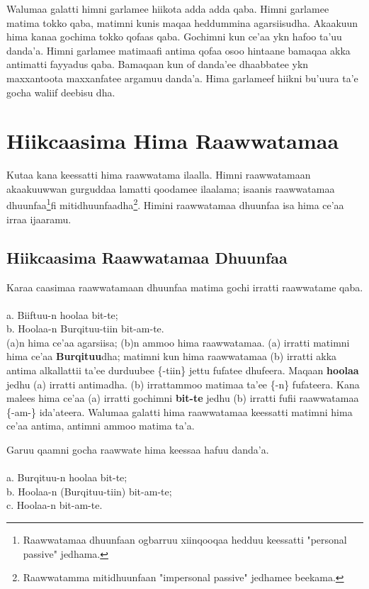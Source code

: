 \documentclass[11pt,b5paper]{book}
\begin{document}
Walumaa galatti himni garlamee hiikota adda adda 	qaba. Himni garlamee matima tokko qaba, matimni kunis 	maqaa heddummina agarsiisudha. Akaakuun hima kanaa 	gochima tokko qofaas qaba. Gochimni kun ce’aa ykn hafoo 	ta’uu danda’a. Himni garlamee matimaafi antima qofaa osoo
hintaane bamaqaa akka antimatti fayyadus qaba. Bamaqaan kun of danda’ee dhaabbatee ykn maxxantoota maxxanfatee argamuu danda’a. Hima garlameef hiikni bu’uura ta’e gocha waliif deebisu dha. 

\section{Hiikcaasima Hima Raawwatamaa}
Kutaa kana keessatti hima raawwatama ilaalla. Himni raawwatamaan akaakuuwwan gurguddaa lamatti qoodamee
ilaalama; isaanis raawwatamaa dhuunfaa\footnote{Raawwatamaa dhuunfaan ogbarruu xiinqooqaa hedduu keessatti "personal passive" jedhama.}fi mitidhuunfaadha\footnote{Raawwatamma mitidhuunfaan "impersonal passive" jedhamee beekama.}. Himini raawwatamaa dhuunfaa isa hima ce’aa
irraa ijaaramu. 
	\subsection{Hiikcaasima Raawwatamaa Dhuunfaa}
Karaa caasimaa raawwatamaan dhuunfaa matima gochi irratti raawwatame qaba. \\
\\
a. Biiftuu-n hoolaa bit-te;\\
b. Hoolaa-n Burqituu-tiin bit-am-te. \\

(a)n hima ce’aa agarsiisa; (b)n ammoo hima raawwatamaa. (a) irratti matimni hima ce’aa \textbf{Burqituu}dha; matimni kun hima raawwatamaa (b) irratti akka antima alkallattii ta’ee
durduubee \{-tiin\} jettu fufatee dhufeera. Maqaan \textbf{hoolaa} jedhu (a) irratti antimadha. (b) irrattammoo matimaa ta’ee \{-n\} fufateera. Kana malees hima ce’aa (a) irratti gochimni \textbf{bit-te}
jedhu (b) irratti fufii raawwatamaa \{-am-\} ida’ateera. Walumaa galatti hima raawwatamaa keessatti matimni hima ce’aa antima, antimni ammoo matima ta’a.

Garuu qaamni gocha raawwate hima keessaa hafuu danda’a.\\
\\
a. Burqituu-n hoolaa bit-te;\\
b. Hoolaa-n (Burqituu-tiin) bit-am-te;\\
c. Hoolaa-n bit-am-te.\\
\end{document}
